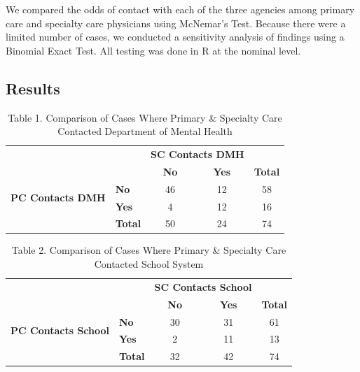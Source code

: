 \documentclass{article}
\begin{document}
	We compared the odds of contact with each of the three agencies among primary care and specialty care physicians using McNemar’s Test. Because there were a limited number of cases, we conducted a sensitivity analysis of findings using a Binomial Exact Test. All testing was done in R at the nominal level.

	\subsection*{Results}


	\begin{table}[h]
		\centering
		\footnotesize
		\captionsetup{labelformat=empty}
		\caption{Table 1. Comparison of Cases Where Primary \& Specialty Care Contacted Department of Mental Health}
		\renewcommand{\arraystretch}{1.2}
		\begin{tabular}{llccc}
			\toprule
			& & \multicolumn{2}{c}{\textbf{SC Contacts DMH}} & \\  
			\cmidrule(lr){3-4}
			& & \textbf{No} & \textbf{Yes} & \textbf{Total} \\  
			\midrule
			\multirow{2}{*}{\textbf{PC Contacts DMH}} & \textbf{No} & 46 & 12 & 58 \\  
			& \textbf{Yes} & 4 & 12 & 16 \\  
			\midrule
			& \textbf{Total} & 50 & 24 & 74 \\  
			\bottomrule
		\end{tabular}
		\label{tab:pc_sc_dmh}
	\end{table}

	\begin{table}[h]
		\centering
		\footnotesize
		\captionsetup{labelformat=empty}
		\caption{Table 2. Comparison of Cases Where Primary \& Specialty Care Contacted School System}
		\renewcommand{\arraystretch}{1.2}
		\begin{tabular}{llccc}
			\toprule
			& & \multicolumn{2}{c}{\textbf{SC Contacts School}} & \\  
			\cmidrule(lr){3-4}
			& & \textbf{No} & \textbf{Yes} & \textbf{Total} \\  
			\midrule
			\multirow{2}{*}{\textbf{PC Contacts School}} & \textbf{No} & 30 & 31 & 61 \\  
			& \textbf{Yes} & 2 & 11 & 13 \\  
			\midrule
			& \textbf{Total} & 32 & 42 & 74 \\  
			\bottomrule
		\end{tabular}
		\label{tab:pc_sc_school}
	\end{table}
\end{document}

